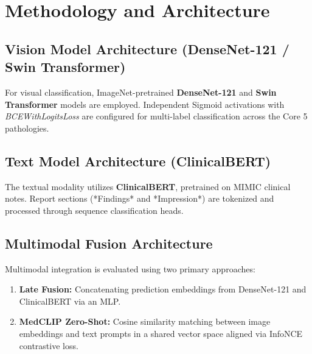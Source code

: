 \chapter{Methodology and Architecture}
\label{ch:methodology}

\section{Vision Model Architecture (DenseNet-121 / Swin Transformer)}
For visual classification, ImageNet-pretrained \textbf{DenseNet-121} and \textbf{Swin Transformer} models are employed. Independent Sigmoid activations with \textit{BCEWithLogitsLoss} are configured for multi-label classification across the Core 5 pathologies.

\section{Text Model Architecture (ClinicalBERT)}
The textual modality utilizes \textbf{ClinicalBERT}, pretrained on MIMIC clinical notes. Report sections (*Findings* and *Impression*) are tokenized and processed through sequence classification heads.

\section{Multimodal Fusion Architecture}
Multimodal integration is evaluated using two primary approaches:
\begin{enumerate}
    \item \textbf{Late Fusion:} Concatenating prediction embeddings from DenseNet-121 and ClinicalBERT via an MLP.
    \item \textbf{MedCLIP Zero-Shot:} Cosine similarity matching between image embeddings and text prompts in a shared vector space aligned via InfoNCE contrastive loss.
\end{enumerate}
